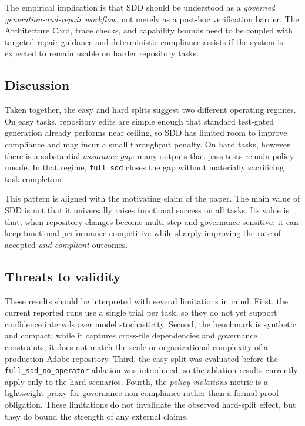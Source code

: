 The empirical implication is that SDD should be understood as a
\emph{governed generation-and-repair workflow}, not merely as a post-hoc
verification barrier. The Architecture Card, trace checks, and capability bounds
need to be coupled with targeted repair guidance and deterministic compliance
assists if the system is expected to remain usable on harder repository tasks.

\subsection{Discussion}

Taken together, the easy and hard splits suggest two different operating regimes.
On easy tasks, repository edits are simple enough that standard test-gated
generation already performs near ceiling, so SDD has limited room to improve
compliance and may incur a small throughput penalty. On hard tasks, however,
there is a substantial \emph{assurance gap}: many outputs that pass tests remain
policy-unsafe. In that regime, \texttt{full\_sdd} closes the gap without
materially sacrificing task completion.

This pattern is aligned with the motivating claim of the paper. The main value
of SDD is not that it universally raises functional success on all tasks. Its
value is that, when repository changes become multi-step and governance-sensitive,
it can keep functional performance competitive while sharply improving the rate
of accepted \emph{and compliant} outcomes.

\subsection{Threats to validity}

These results should be interpreted with several limitations in mind.
First, the current reported runs use a single trial per task, so they do not yet
support confidence intervals over model stochasticity. Second, the benchmark is
synthetic and compact; while it captures cross-file dependencies and governance
constraints, it does not match the scale or organizational complexity of a
production Adobe repository. Third, the easy split was evaluated before the
\texttt{full\_sdd\_no\_operator} ablation was introduced, so the ablation results
currently apply only to the hard scenarios. Fourth, the \textit{policy violations}
metric is a lightweight proxy for governance non-compliance rather than a formal
proof obligation. These limitations do not invalidate the observed hard-split
effect, but they do bound the strength of any external claims.

